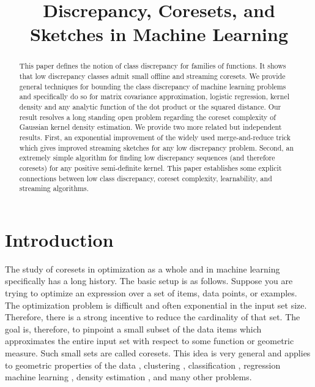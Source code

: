 \documentclass[anon,12pt]{colt2019} %
\title[Discrepancy, Coresets, and Sketches in Machine Learning]{Discrepancy, Coresets, and Sketches in Machine Learning}
\begin{document}
\maketitle

\begin{abstract}
This paper defines the notion of class discrepancy for families of functions.  It shows that low discrepancy classes admit small offline and streaming coresets. We provide general techniques for bounding the class discrepancy of machine learning problems and specifically do so for matrix covariance approximation, logistic regression, kernel density and any analytic function of the dot product or the squared distance.
Our result resolves a long standing open problem regarding the coreset complexity of Gaussian kernel density estimation.  
We provide two more related but independent results. 
First, an exponential improvement of the widely used merge-and-reduce trick which gives improved streaming sketches for any low discrepancy problem.
Second, an extremely simple algorithm for finding low discrepancy sequences (and therefore coresets) for any positive semi-definite kernel. 
This paper establishes some explicit connections between low class discrepancy, coreset complexity, learnability, and streaming algorithms. 
\end{abstract}


\section{Introduction}
The study of coresets in optimization as a whole and in machine learning specifically has a long history. 
The basic setup is as follows.
Suppose you are trying to optimize an expression over a set of items, data points, or examples.
The optimization problem is difficult and often exponential in the input set size.
Therefore, there is a strong incentive to reduce the cardinality of that set. 
The goal is, therefore, to pinpoint a small subset of the data items which approximates the entire input set with respect to some function or geometric measure. Such small sets are called coresets. 
This idea is very general and applies to geometric properties of the data \cite{agarwal2005geometric}, 
clustering \cite{DBLP:conf/compgeom/Har-PeledK05} \cite{DBLP:conf/stoc/FeldmanL11}, classification \cite{DBLP:conf/ijcai/Har-PeledRZ07}, regression \cite{DBLP:conf/nips/MunteanuSSW18} 
machine learning \cite{bachem2017practical}, density estimation \cite{DBLP:journals/corr/abs-1802-01751}, and many other problems. 
\end{document}
